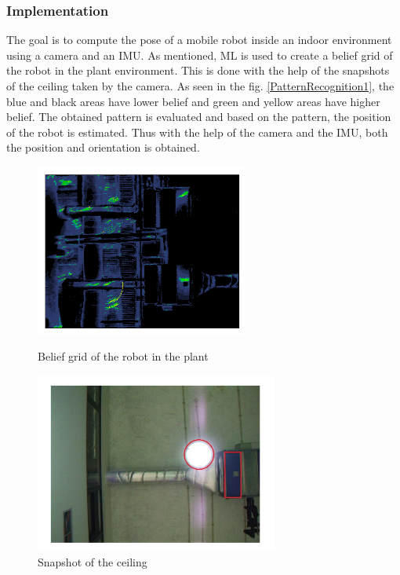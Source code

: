 \subsubsection*{Implementation}
The goal is to compute the pose of a mobile robot inside an indoor environment using a camera and an IMU. As mentioned, ML is used to create a belief grid of the robot in the plant environment. This is done with the help of the snapshots of the ceiling taken by the camera. As seen in the fig. \ref{PatternRecognition1}, the blue and black areas have lower belief and green and yellow areas have higher belief. The obtained pattern is evaluated and based on the pattern, the position of the robot is estimated. Thus with the help of the camera and the IMU, both the position and orientation is obtained.
\begin{figure}[!htbp]
	\centering
	\begin{minipage}{.5\textwidth}
		\centering
		\includegraphics[width = 7cm]{Pictures/beliefgrid.png}
		\caption{Belief grid of the robot in the plant}
		\label{PatternRecognition1}
	\end{minipage}%
	\begin{minipage}{.5\textwidth}
		\centering
		\includegraphics[width = 8cm]{Pictures/snapshot.png}
		\caption{Snapshot of the ceiling }
		\label{PatternRecognition2}
	\end{minipage}
\end{figure}

